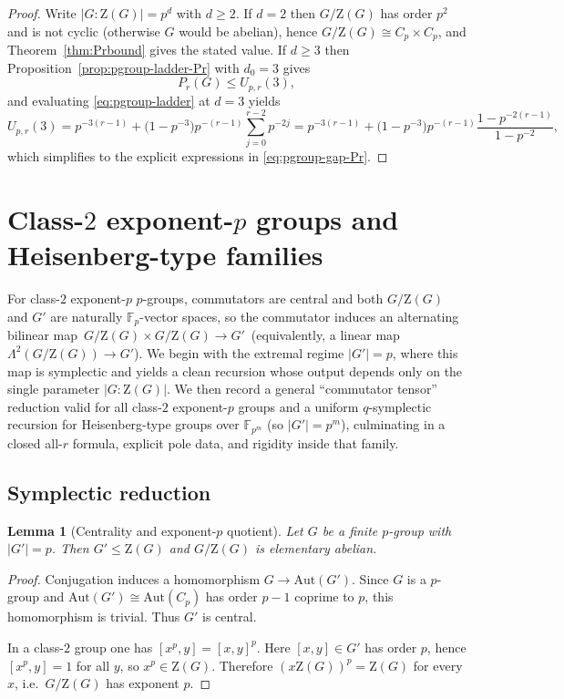 \documentclass[11pt]{article}
\newtheorem{lemma}[theorem]{Lemma}
\theoremstyle{definition}
\theoremstyle{remark}
\theoremstyle{definition}
\theoremstyle{plain}
\newcommand{\Z}{\mathrm{Z}}
\newcommand{\Aut}{\mathrm{Aut}}
\begin{document}
\begin{proof}
Write $|G:\Z(G)|=p^d$ with $d\ge 2$.
If $d=2$ then $G/\Z(G)$ has order $p^2$ and is not cyclic (otherwise $G$ would be abelian), hence
$G/\Z(G)\cong C_p\times C_p$, and Theorem~\ref{thm:Prbound} gives the stated value.
If $d\ge 3$ then Proposition~\ref{prop:pgroup-ladder-Pr} with $d_0=3$ gives
\[
P_r(G)\le U_{p,r}(3),
\]
and evaluating \eqref{eq:pgroup-ladder} at $d=3$ yields
\[
U_{p,r}(3)
=p^{-3(r-1)}+\Big(1-p^{-3}\Big)p^{-(r-1)}\sum_{j=0}^{r-2}p^{-2j}
=p^{-3(r-1)}+\Big(1-p^{-3}\Big)p^{-(r-1)}\frac{1-p^{-2(r-1)}}{1-p^{-2}},
\]
which simplifies to the explicit expressions in \eqref{eq:pgroup-gap-Pr}.
\end{proof}

\section{Class-\texorpdfstring{$2$ exponent-$p$}{2 exponent-p} groups and Heisenberg-type families}\label{sec:pgroup_orderp}

For class-$2$ exponent-$p$ $p$-groups, commutators are central and both $G/\Z(G)$ and $G'$ are naturally
$\mathbb F_p$-vector spaces, so the commutator induces an alternating bilinear map
$\,G/\Z(G)\times G/\Z(G)\to G'\,$ (equivalently, a linear map $\Lambda^2(G/\Z(G))\to G'$).
We begin with the extremal regime $|G'|=p$, where this map is symplectic and yields a clean recursion whose
output depends only on the single parameter $|G:\Z(G)|$.
We then record a general ``commutator tensor'' reduction valid for all class-$2$ exponent-$p$ groups and a
uniform $q$-symplectic recursion for Heisenberg-type groups over $\mathbb F_{p^m}$ (so $|G'|=p^m$), culminating in a
closed all-$r$ formula, explicit pole data, and rigidity inside that family.

\subsection{Symplectic reduction}

\begin{lemma}[Centrality and exponent-\texorpdfstring{$p$}{p} quotient]\label{lem:orderp-commutator-class2}
Let $G$ be a finite $p$-group with $|G'|=p$.
Then $G'\le \Z(G)$ and $G/\Z(G)$ is elementary abelian.
\end{lemma}

\begin{proof}
Conjugation induces a homomorphism $G\to \Aut(G')$.
Since $G$ is a $p$-group and $\Aut(G')\cong \Aut(C_p)$ has order $p-1$ coprime to $p$,
this homomorphism is trivial.
Thus $G'$ is central.

In a class-$2$ group one has $[x^p,y]=[x,y]^p$.
Here $[x,y]\in G'$ has order $p$, hence $[x^p,y]=1$ for all $y$, so $x^p\in \Z(G)$.
Therefore $(x\Z(G))^p=\Z(G)$ for every $x$, i.e.\ $G/\Z(G)$ has exponent $p$.
\end{proof}
\end{document}
